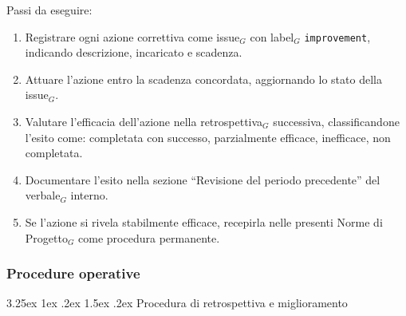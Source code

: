 \documentclass[a4paper, 10pt]{article}
\makeatletter
\renewcommand\paragraph{\@startsection{paragraph}{4}{\z@}%
  {3.25ex \@plus1ex \@minus .2ex}%
  {1.5ex \@plus .2ex}%
  {\normalfont\normalsize\bfseries}}
\makeatother
\begin{document}
\noindent Passi da eseguire:
\begin{enumerate}
    \item Registrare ogni azione correttiva come issue$_G$ con label$_G$ \texttt{improvement}, indicando descrizione, incaricato e scadenza.
    \item Attuare l'azione entro la scadenza concordata, aggiornando lo stato della issue$_G$.
    \item Valutare l'efficacia dell'azione nella retrospettiva$_G$ successiva, classificandone l'esito come: completata con successo, parzialmente efficace, inefficace, non completata.
    \item Documentare l'esito nella sezione ``Revisione del periodo precedente'' del verbale$_G$ interno.
    \item Se l'azione si rivela stabilmente efficace, recepirla nelle presenti Norme di Progetto$_G$ come procedura permanente.
\end{enumerate}

\subsubsection{Procedure operative}
\label{subsubsec:procedure_miglioramento}

\paragraph{Procedura di retrospettiva e miglioramento}
\end{document}
